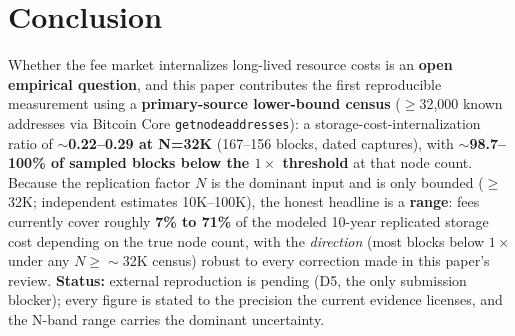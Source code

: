 \documentclass[11pt]{article}
\begin{document}
\section{Conclusion}\label{sec:9}
Whether the fee market internalizes long-lived resource costs is an \textbf{open empirical question}, and this paper contributes the first reproducible measurement using a \textbf{primary-source lower-bound census} ($\geq$32{,}000 known addresses via Bitcoin Core \texttt{getnodeaddresses}): a storage-cost-internalization ratio of \textbf{$\sim$0.22--0.29 at N=32K} (167--156 blocks, dated captures), with \textbf{$\sim$98.7--100\% of sampled blocks below the $1\times$ threshold} at that node count. Because the replication factor $N$ is the dominant input and is only bounded ($\geq$32K; independent estimates 10K--100K), the honest headline is a \textbf{range}: fees currently cover roughly \textbf{7\% to 71\%} of the modeled 10-year replicated storage cost depending on the true node count, with the \emph{direction} (most blocks below $1\times$ under any $N \geq \sim$32K census) robust to every correction made in this paper's review. \textbf{Status:} external reproduction is pending (D5, the only submission blocker); every figure is stated to the precision the current evidence licenses, and the N-band range carries the dominant uncertainty.
\end{document}
